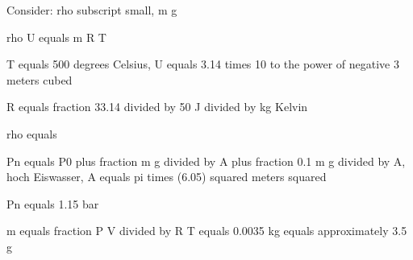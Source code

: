 Consider: rho subscript small, m g

rho U equals m R T

T equals 500 degrees Celsius, U equals 3.14 times 10 to the power of negative 3 meters cubed

R equals fraction 33.14 divided by 50 J divided by kg Kelvin

rho equals

Pn equals P0 plus fraction m g divided by A plus fraction 0.1 m g divided by A, hoch Eiswasser, A equals pi times (6.05) squared meters squared

Pn equals 1.15 bar

m equals fraction P V divided by R T equals 0.0035 kg equals approximately 3.5 g